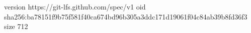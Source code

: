 version https://git-lfs.github.com/spec/v1
oid sha256:ba78151f9b75f581f40ca674bd96b305a3ddc171d19061f04c84ab39b8fd36f3
size 712
